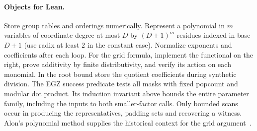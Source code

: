 \paragraph{Objects for Lean.} Store group tables and orderings numerically. Represent a polynomial in $m$ variables of coordinate degree at most $D$ by $(D+1)^m$ residues indexed in base $D+1$ (use radix at least $2$ in the constant case). Normalize exponents and coefficients after each loop. For the grid formula, implement the functional on the right, prove additivity by finite distributivity, and verify its action on each monomial. In the root bound store the quotient coefficients during synthetic division. The EGZ success predicate tests all masks with fixed popcount and modular dot product. Its induction invariant above bounds the entire parameter family, including the inputs to both smaller-factor calls. Only bounded scans occur in producing the representatives, padding sets and recovering a witness. Alon's polynomial method supplies the historical context for the grid argument~\cite{alon}.
